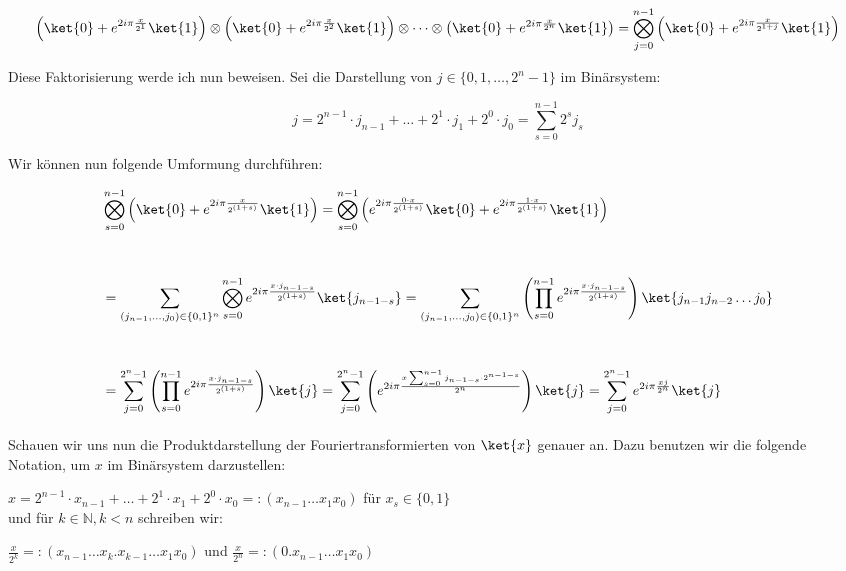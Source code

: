 \begin{align*}
    \left(\ket{0} + e^{2i\pi\frac{x}{2^{1}}}\ket{1}\right)\otimes\left(\ket{0} + e^{2i\pi\frac{x}{2^{2}}}\ket{1}\right)\otimes\cdots\otimes\left(\ket{0} + e^{2i\pi\frac{x}{2^{n}}}\ket{1}\right) = \bigotimes_{j = 0}^{n - 1}\left(\ket{0} + e^{2i\pi\frac{x}{2^{1 + j}}}\ket{1}\right)
\end{align*}

\noindent Diese Faktorisierung werde ich nun beweisen. Sei die Darstellung von $j \in \{0, 1, \dots, 2^n - 1\}$ im Binärsystem:

$$j=2^{n-1}\cdot j_{n-1}+\ldots + 2^1\cdot j_1+2^0\cdot j_0 = \sum_{s = 0}^{n - 1}2^sj_s$$

\noindent Wir können nun folgende Umformung durchführen:

\begin{align*}
&\bigotimes_{s = 0}^{n - 1}{\left( \ket{0} + e^{2i\pi\frac{x}{2^{(1 + s)}}}\ket{1} \right)} = \bigotimes_{s = 0}^{n - 1}{\left( e^{2i\pi\frac{0\cdot x}{2^{(1 + s)}}}\ket{0} + e^{2i\pi\frac{1 \cdot x}{2^{(1 + s)}}}\ket{1} \right)} \\[1cm] &= \sum_{(j_{n-1},\dots,j_0)\in \{0, 1\}^n}\bigotimes_{s = 0}^{n - 1}e^{2i\pi\frac{x\cdot j_{n - 1 - s}}{2^{(1 + s)}}}\ket{j_{n - 1 - s}} = \sum_{(j_{n-1},\dots,j_0)\in \{0, 1\}^n}\left( \prod_{s = 0}^{n - 1}e^{2i\pi\frac{x\cdot j_{n - 1 - s}}{2^{(1 + s)}}} \right)\ket{j_{n - 1}j_{n - 2}\dots j_0} \\[1cm] &= \sum_{j = 0}^{2^n - 1} \left( \prod_{s = 0}^{n - 1}e^{2i\pi\frac{x\cdot j_{n - 1 - s}}{2^{(1 + s)}}} \right) \ket{j} = \sum_{j = 0}^{2^n - 1}\left( e^{2i\pi\frac{x\sum_{s = 0}^{n - 1}{j_{n - 1 - s}\cdot 2^{n - 1 - s}}}{2^n}} \right)\ket{j} = \sum_{j = 0}^{2^n - 1}e^{2i\pi\frac{xj}{2^n}}\ket{j}
\end{align*}
\paragraph{}

\noindent Schauen wir uns nun die Produktdarstellung der Fouriertransformierten von $\ket{x}$ genauer an. Dazu benutzen wir die folgende Notation, um $x$ im Binärsystem darzustellen:

$x = 2^{n - 1}\cdot x_{n - 1} + \dots + 2^1 \cdot x_1 + 2^0 \cdot x_0 =: (x_{n - 1}\dots x_1x_0)$ \quad für $x_s \in \{0, 1\}$ \\
und für $k \in \mathbb{N}, k < n$ schreiben wir:

$\frac{x}{2^k} =: (x_{n - 1}\dots x_k.x_{k - 1}\dots x_1x_0)$ \quad und \quad $\frac{x}{2^n} =: (0.x_{n - 1}\dots x_1x_0)$

